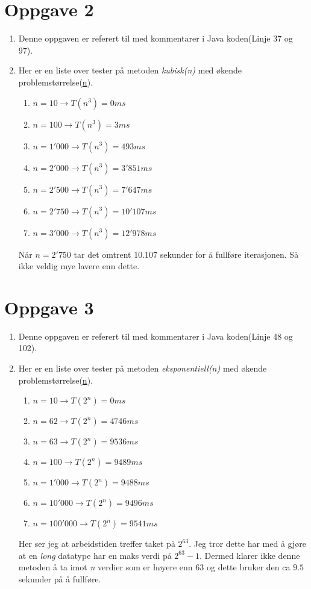 \documentclass{article}
\begin{document}
\section*{Oppgave 2}
\begin{enumerate}[label=\alph*)]
\item Denne oppgaven er referert til med kommentarer i Java koden(Linje 37 og 97).
\item Her er en liste over tester på metoden \textit{kubisk(n)} med økende problemstørrelse(\underline{n}).
\begin{enumerate}[label=-]
\item $n = 10 \to T(n^3) = 0ms$
\item $n = 100 \to T(n^3) = 3ms$
\item $n = 1'000 \to T(n^3) = 493ms$
\item $n = 2'000 \to T(n^3) = 3'851ms$
\item $n = 2'500 \to T(n^3) = 7'647ms$
\item $n = 2'750 \to T(n^3) = 10'107ms$
\item $n = 3'000 \to T(n^3) = 12'978ms$
\end{enumerate}
Når $n = 2'750$ tar det omtrent $10.107$ sekunder for å fullføre iterasjonen. Så ikke veldig mye lavere enn dette.
\end{enumerate}
\section*{Oppgave 3}
\begin{enumerate}[label=\alph*)]
\item Denne oppgaven er referert til med kommentarer i Java koden(Linje 48 og 102).
\item Her er en liste over tester på metoden \textit{eksponentiell(n)} med økende problemstørrelse(\underline{n}).
\begin{enumerate}[label=-]
\item $n = 10 \to T(2^n) = 0ms$
\item $n = 62 \to T(2^n) = 4746ms$
\item $n = 63 \to T(2^n) = 9536ms$
\item $n = 100 \to T(2^n) = 9489ms$
\item $n = 1'000 \to T(2^n) = 9488ms$
\item $n = 10'000 \to T(2^n) = 9496ms$
\item $n = 100'000 \to T(2^n) = 9541ms$
\end{enumerate}
Her ser jeg at arbeidstiden treffer taket på $2^{63}$. Jeg tror dette har med å gjøre at en \textit{long} datatype har en maks verdi på $2^{63} - 1$. Dermed klarer ikke denne metoden å ta imot \textit{n} verdier som er høyere enn $63$ og dette bruker den ca $9.5$ sekunder på å fullføre.
\end{enumerate}
\end{document}
